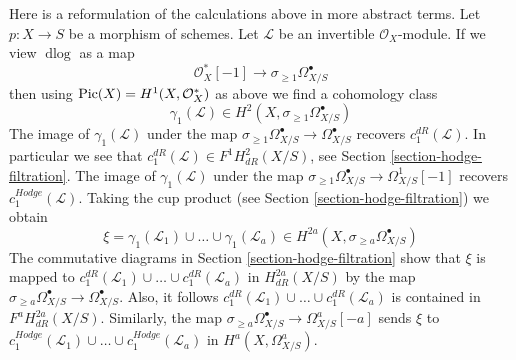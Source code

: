 \begin{remark}
\label{remark-truncations}
Here is a reformulation of the calculations above in more abstract terms.
Let $p : X \to S$ be a morphism of schemes. Let $\mathcal{L}$ be an
invertible $\mathcal{O}_X$-module. If we view $\text{d}\log$ as a map
$$
\mathcal{O}_X^*[-1] \to \sigma_{\geq 1}\Omega^\bullet_{X/S}
$$
then using $\mathop{\mathrm{Pic}}\nolimits(X) = H^1(X, \mathcal{O}_X^*)$ as above we find a
cohomology class
$$
\gamma_1(\mathcal{L}) \in H^2(X, \sigma_{\geq 1}\Omega^\bullet_{X/S})
$$
The image of $\gamma_1(\mathcal{L})$ under the map
$\sigma_{\geq 1}\Omega^\bullet_{X/S} \to \Omega^\bullet_{X/S}$
recovers $c_1^{dR}(\mathcal{L})$. In particular we see that
$c_1^{dR}(\mathcal{L}) \in F^1H^2_{dR}(X/S)$, see
Section \ref{section-hodge-filtration}. The image of $\gamma_1(\mathcal{L})$
under the map $\sigma_{\geq 1}\Omega^\bullet_{X/S} \to \Omega^1_{X/S}[-1]$
recovers $c_1^{Hodge}(\mathcal{L})$. Taking the cup product
(see Section \ref{section-hodge-filtration}) we obtain
$$
\xi = \gamma_1(\mathcal{L}_1) \cup \ldots \cup \gamma_1(\mathcal{L}_a) \in
H^{2a}(X, \sigma_{\geq a}\Omega^\bullet_{X/S})
$$
The commutative diagrams in Section \ref{section-hodge-filtration}
show that $\xi$ is mapped to
$c_1^{dR}(\mathcal{L}_1) \cup \ldots \cup c_1^{dR}(\mathcal{L}_a)$
in $H^{2a}_{dR}(X/S)$ by the map
$\sigma_{\geq a}\Omega^\bullet_{X/S} \to \Omega^\bullet_{X/S}$.
Also, it follows
$c_1^{dR}(\mathcal{L}_1) \cup \ldots \cup c_1^{dR}(\mathcal{L}_a)$
is contained in $F^a H^{2a}_{dR}(X/S)$. Similarly, the map
$\sigma_{\geq a}\Omega^\bullet_{X/S} \to \Omega^a_{X/S}[-a]$
sends $\xi$ to
$c_1^{Hodge}(\mathcal{L}_1) \cup \ldots \cup c_1^{Hodge}(\mathcal{L}_a)$
in $H^a(X, \Omega^a_{X/S})$.
\end{remark}

